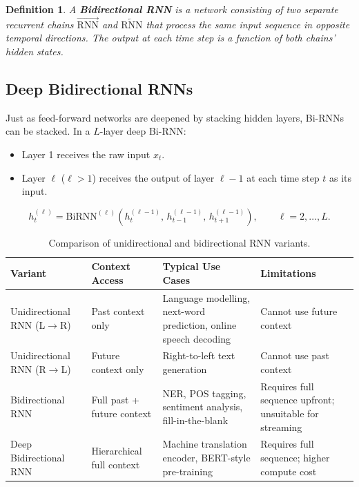 \documentclass[12pt,a4paper]{article}
\newtheorem{definition}{Definition}[section]
\begin{document}
\begin{definition}
  \label{def:birnn}
  A \textbf{Bidirectional RNN} is a network consisting of two separate
  recurrent chains $\overrightarrow{\mathrm{RNN}}$ and
  $\overleftarrow{\mathrm{RNN}}$ that process the same input sequence in
  opposite temporal directions.  The output at each time step is a function of
  both chains' hidden states.
\end{definition}

\subsection{Deep Bidirectional RNNs}
\label{subsec:deep_birnn}

Just as feed-forward networks are deepened by stacking hidden layers, Bi-RNNs
can be stacked.  In a $L$-layer deep Bi-RNN:
\begin{itemize}
  \item Layer 1 receives the raw input $x_t$.
  \item Layer $\ell$ ($\ell > 1$) receives the output of layer $\ell-1$ at
        each time step $t$ as its input.
\end{itemize}

\begin{equation}
  h^{(\ell)}_t = \text{BiRNN}^{(\ell)}\!\left(h^{(\ell-1)}_t,\,
                   h^{(\ell-1)}_{t-1},\, h^{(\ell-1)}_{t+1}\right),
  \qquad \ell = 2, \ldots, L.
  \label{eq:deep_birnn}
\end{equation}

\begin{table}[ht]
\centering
\caption{Comparison of unidirectional and bidirectional RNN variants.}
\label{tab:rnn_comparison}
\begin{tabularx}{\textwidth}{lXXX}
\toprule
\textbf{Variant} & \textbf{Context Access} & \textbf{Typical Use Cases}
                 & \textbf{Limitations} \\
\midrule
Unidirectional RNN (L$\to$R) &
  Past context only &
  Language modelling, next-word prediction, online speech decoding &
  Cannot use future context \\
\addlinespace
Unidirectional RNN (R$\to$L) &
  Future context only &
  Right-to-left text generation &
  Cannot use past context \\
\addlinespace
Bidirectional RNN &
  Full past + future context &
  NER, POS tagging, sentiment analysis, fill-in-the-blank &
  Requires full sequence upfront; unsuitable for streaming \\
\addlinespace
Deep Bidirectional RNN &
  Hierarchical full context &
  Machine translation encoder, BERT-style pre-training &
  Requires full sequence; higher compute cost \\
\bottomrule
\end{tabularx}
\end{table}
\end{document}
